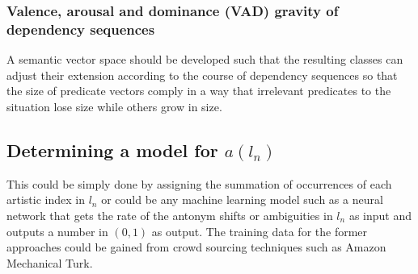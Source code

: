 \documentclass{article}
\begin{document}
	\subsubsection{Valence, arousal and dominance (VAD) gravity of dependency sequences} \label{sec:methodology-vad}
	A semantic vector space should be developed such that the resulting classes can adjust their extension according to the course of dependency sequences so that the size of predicate vectors comply in a way that irrelevant predicates to the situation lose size while others grow in size. 
	
	\subsection{Determining a model for $a(l_n)$}
	This could be simply done by assigning the summation of occurrences of each artistic index in $l_n$ or could be any machine learning model such as a neural network that gets the rate of the antonym shifts or ambiguities in $l_n$ as input and outputs a number in $(0,1)$ as output. The training data for the former approaches could be gained from crowd sourcing techniques such as Amazon Mechanical Turk. 
\end{document}
